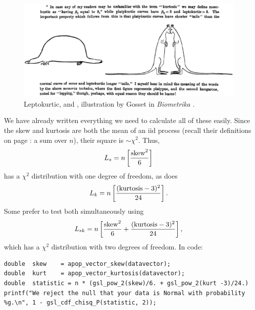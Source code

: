 \begin{figure}[tb]
\hspace{-.3in}\includegraphics[width=\textwidth*\real{1.1}]{kurtosis.eps}
\caption{Leptokurtic,  and , illustration by Gosset in {\em Biometrika} \citep[p 160]{student:errors}. }
\label{tailfig}
\end{figure}


We have already written everything we need to calculate all of these easily.
Since the skew and kurtosis are both the mean of an iid process (recall
their definitions on page \pageref{kurtskew}: a sum over $n$), their
square is $\sim \chi^2$. Thus,
$$L_s = n\left[{{\rm skew}^2\over 6}\right]$$
has a $\chi^2$ distribution with one degree of freedom, as does
$$L_k = n\left[{({\rm kurtosis}-3)^2\over 24}\right].$$
Some prefer to test both simultaneously using
$$L_{sk} = n\left[{{\rm skew}^2\over 6} + {({\rm kurtosis}-3)^2\over 24}\right],$$
which has a $\chi^2$ distribution with two degrees of freedom. In code:

\begin{lstlisting}
double  skew    = apop_vector_skew(datavector);
double  kurt    = apop_vector_kurtosis(datavector);
double  statistic = n * (gsl_pow_2(skew)/6. + gsl_pow_2(kurt -3)/24.)
printf("We reject the null that your data is Normal with probability %g.\n", 1 - gsl_cdf_chisq_P(statistic, 2));
\end{lstlisting}

